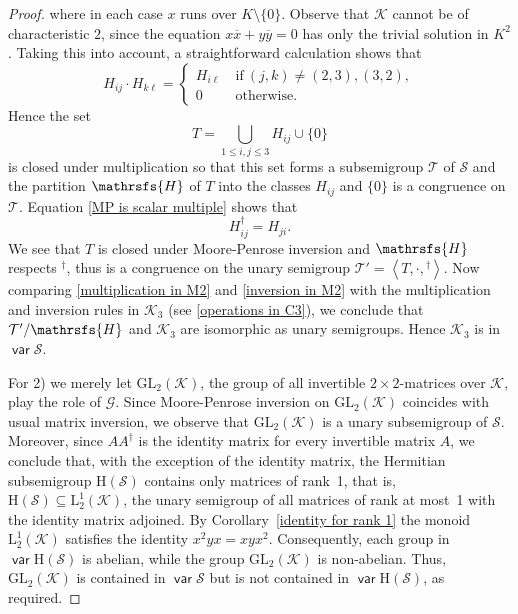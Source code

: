\documentclass[11pt,reqno]{amsart}
\DeclareMathOperator{\var}{\mathsf{var}}
\numberwithin{equation}{section}
\theoremstyle{remark}
\def\cal{\mathcal}
\def\Hc{\mathrsfs{H}}
\def\Sc{{\cal S}}
\def\ol{\overline}
\def\H{\mathrm H}
\begin{document}
\begin{proof}
where in each case $x$ runs over $K\setminus\{0\}$. Observe that
$\mathcal{K}$ cannot be of characteristic $2$, since the equation
$x\ol x+y\ol y=0$ has only the trivial solution in ${K}^2$. Taking
this into account, a straightforward calculation shows that
\begin{equation}
\label{multiplication in M2} H_{ij}\cdot
H_{k\ell}=\left\{\begin{array}{cl}
H_{i\ell}&\ \text{if}\ (j,k)\ne(2,3),(3,2),\\
0 &\ \text{otherwise}.
\end{array}\right.
\end{equation}
Hence the set
$$T=\bigcup_{1\le i,j\le3}H_{ij}\cup\{0\}$$
is closed under multiplication so that this set forms a
subsemigroup $\mathcal{T}$ of $\Sc$ and the partition $\Hc$ of $T$
into the classes $H_{ij}$ and $\{0\}$ is a congruence on
$\mathcal{T}$. Equation \eqref{MP is scalar multiple} shows that
\begin{equation}
\label{inversion in M2} H_{ij}^\dag=H_{ji}.
\end{equation}
We see that $T$ is closed under Moore-Penrose inversion and $\Hc$
respects $^\dag$, thus is a congruence on the unary semigroup
$\mathcal{T}'=\left<T,\cdot,{}^\dag\right>$. Now comparing
\eqref{multiplication in M2} and \eqref{inversion in M2} with the
multiplication and inversion rules in $\mathcal{K}_3$ (see
\eqref{operations in C3}), we conclude that $\mathcal{T}'/\Hc$ and
$\mathcal{K}_3$ are isomorphic as unary semigroups. Hence
$\mathcal{K}_3$ is in $\var\Sc$.

For 2) we merely let $\mathrm{GL}_2(\mathcal{K})$, the group of
all invertible $2\times 2$-matrices over $\mathcal{K}$, play the
role of $\mathcal{G}$. Since Moore-Penrose inversion on
$\mathrm{GL}_2(\mathcal{K})$ coincides with usual matrix
inversion, we observe that $\mathrm{GL}_2(\mathcal{K})$  is a
unary subsemigroup of $\Sc$. Moreover, since $AA^\dag$ is the
identity matrix for every invertible matrix $A$, we conclude that,
with the exception of the identity matrix, the Hermitian
subsemigroup $\H(\Sc)$ contains only matrices of rank~1, that is,
$\H(\Sc)\subseteq\mathrm{L}^1_2(\mathcal{K})$, the unary semigroup
of all matrices of rank at most~1 with the identity matrix
adjoined. By Corollary~\ref{identity for rank 1} the monoid
$\mathrm{L}^1_2(\mathcal{K})$ satisfies the identity
$x^2yx=xyx^2$. Consequently, each group in $\var\H(\Sc)$ is
abelian, while the group $\mathrm{GL}_2(\mathcal{K})$ is
non-abelian. Thus, $\mathrm{GL}_2(\mathcal{K})$ is contained in
$\var\Sc$ but is not contained in $\var\H(\Sc)$, as required.
\end{proof}
\end{document}
